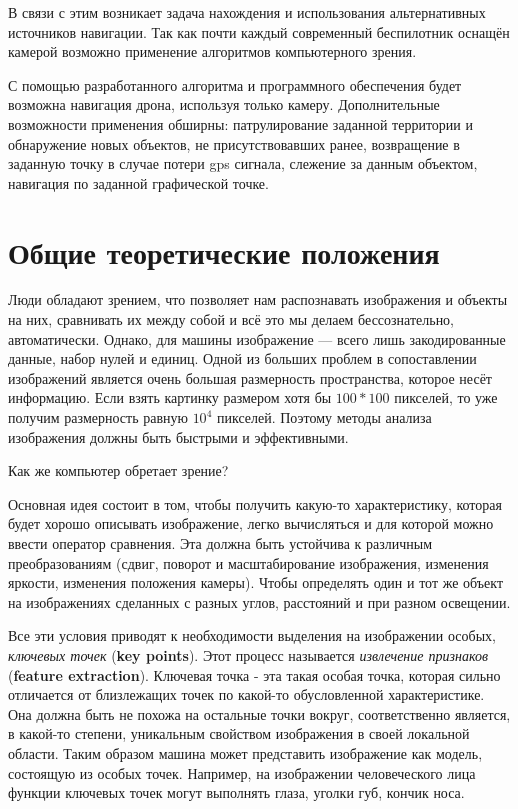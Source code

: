 В связи с этим возникает задача нахождения и использования альтернативных источников навигации. Так как почти каждый современный беспилотник оснащён камерой возможно применение алгоритмов компьютерного зрения.

С помощью разработанного алгоритма и программного обеспечения будет возможна навигация дрона, используя только камеру. Дополнительные возможности применения обширны: патрулирование заданной территории и обнаружение новых объектов, не присутствовавших ранее, возвращение в заданную точку в случае потери gps сигнала, слежение за данным объектом, навигация по заданной графической точке.

\section{Общие теоретические положения}   

Люди обладают зрением, что позволяет нам распознавать изображения и объекты на них, сравнивать их между собой и всё это мы делаем бессознательно, автоматически. Однако, для машины изображение — всего лишь закодированные данные, набор нулей и единиц. Одной из больших проблем в сопоставлении изображений является очень большая размерность пространства, которое несёт информацию. Если взять картинку размером хотя бы $100*100$ пикселей, то уже получим размерность равную $10^4$ пикселей. Поэтому методы анализа изображения должны быть быстрыми и эффективными. 

Как же компьютер обретает зрение? 

Основная идея состоит в том, чтобы получить какую-то характеристику, которая будет хорошо описывать изображение, легко вычисляться и для которой можно ввести оператор сравнения. Эта  должна быть устойчива к различным преобразованиям (сдвиг, поворот и масштабирование изображения, изменения яркости, изменения положения камеры). Чтобы определять один и тот же объект на изображениях сделанных с разных углов, расстояний и при разном освещении.

Все эти условия приводят к необходимости выделения на изображении особых, \textit{ключевых точек} (\textbf{key points}). Этот процесс называется \textit{извлечение признаков} (\textbf{feature extraction}). Ключевая точка - эта такая особая точка, которая сильно отличается от близлежащих точек по какой-то обусловленной характеристике. Она должна быть не похожа на остальные точки вокруг, соответственно является, в какой-то степени, уникальным свойством изображения в своей локальной области. Таким образом машина может представить изображение как модель, состоящую из особых точек. Например, на изображении человеческого лица функции ключевых точек могут выполнять глаза, уголки губ, кончик носа.

